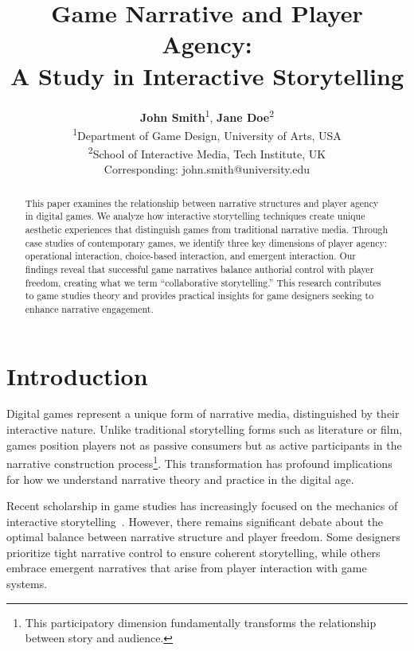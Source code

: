 \documentclass[red,fullpaper]{ludusofficial}  %
\title{Game Narrative and Player Agency:\\[8pt]A Study in Interactive Storytelling}
\author{%
    \textbf{John Smith}\textsuperscript{1}, \textbf{Jane Doe}\textsuperscript{2}\\[0.2cm]
    \mdseries\small\textsuperscript{1}Department of Game Design, University of Arts, USA\\
    \small\textsuperscript{2}School of Interactive Media, Tech Institute, UK\\
    \small Corresponding: john.smith@university.edu
}
\begin{document}
\begin{abstract}
This paper examines the relationship between narrative structures and player agency in digital games. We analyze how interactive storytelling techniques create unique aesthetic experiences that distinguish games from traditional narrative media. Through case studies of contemporary games, we identify three key dimensions of player agency: operational interaction, choice-based interaction, and emergent interaction. Our findings reveal that successful game narratives balance authorial control with player freedom, creating what we term ``collaborative storytelling.'' This research contributes to game studies theory and provides practical insights for game designers seeking to enhance narrative engagement.
\end{abstract}


\maketitle

\section{Introduction}

Digital games represent a unique form of narrative media, distinguished by their interactive nature. Unlike traditional storytelling forms such as literature or film, games position players not as passive consumers but as active participants in the narrative construction process\footnote{This participatory dimension fundamentally transforms the relationship between story and audience.}. This transformation has profound implications for how we understand narrative theory and practice in the digital age.

Recent scholarship in game studies has increasingly focused on the mechanics of interactive storytelling~\cite{murray1997,jenkins2004}. However, there remains significant debate about the optimal balance between narrative structure and player freedom. Some designers prioritize tight narrative control to ensure coherent storytelling, while others embrace emergent narratives that arise from player interaction with game systems.
\end{document}

